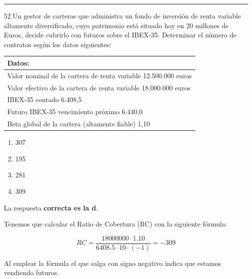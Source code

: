 \documentclass[
  letterpaper,
  DIV=11,
  numbers=noendperiod]{scrreprt}
\begin{document}
\begin{center}\rule{0.5\linewidth}{0.5pt}\end{center}

52.Un gestor de carteras que administra un fondo de inversión de renta
variable altamente diversificado, cuyo patrimonio está situado hoy en 20
millones de Euros, decide cubrirlo con futuros sobre el IBEX-35.
Determinar el número de contratos según los datos siguientes:

\begin{longtable}[]{@{}l@{}}
\toprule()
\textbf{Datos:} \\
\midrule()
\endhead
Valor nominal de la cartera de renta variable 12.500.000 euros \\
Valor efectivo de la cartera de renta variable 18.000.000 euros \\
IBEX-35 contado 6.408,5 \\
Futuro IBEX-35 vencimiento próximo 6.440,0 \\
Beta global de la cartera (altamente fiable) 1,10 \\
\bottomrule()
\end{longtable}

\begin{enumerate}
\def\labelenumi{\alph{enumi})}
\item
  307
\item
  195
\item
  281
\item
  309
\end{enumerate}

\begin{tcolorbox}[enhanced jigsaw, left=2mm, opacityback=0, colback=white, breakable, arc=.35mm, bottomrule=.15mm, rightrule=.15mm, toprule=.15mm, leftrule=.75mm, colframe=quarto-callout-tip-color-frame]
\begin{minipage}[t]{5.5mm}
\textcolor{quarto-callout-tip-color}{\faLightbulb}
\end{minipage}%
\begin{minipage}[t]{\textwidth - 5.5mm}

La respuesta \textbf{correcta es la d}.

Tenemos que calcular el Ratio de Cobertura (RC) con la siguiente
fórmula:

\[RC=\frac{18000000\cdot1.10}{6408.5\cdot10\cdot(-1)}=-309\]

Al emplear la fórmula el que salga con signo negativo indica que estamos
vendiendo futuros.

\end{minipage}%
\end{tcolorbox}
\end{document}
